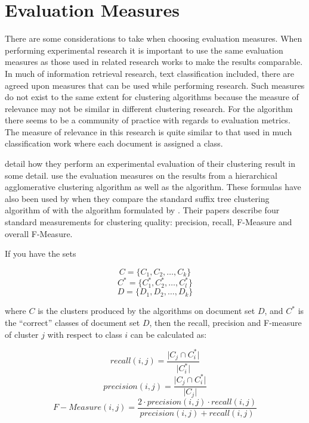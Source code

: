 \section{Evaluation Measures}
\label{EvaluationMeasures}
There are some considerations to take when choosing evaluation measures. When performing experimental research it is important to use the same evaluation measures as those used in related research works to make the results comparable. In much of information retrieval research, text classification included, there are agreed upon measures that can be used while performing research. Such measures do not exist to the same extent for clustering algorithms because the measure of relevance may not be similar in different clustering research. For the \STC algorithm there seems to be a community of practice with regards to evaluation metrics. The measure of relevance in this research is quite similar to that used in much classification work where each document is assigned a class.

\cite{Chim2007} detail how they perform an experimental evaluation of their clustering result in some detail. \citeauthor{Chim2007} use the evaluation measures on the results from a hierarchical agglomerative clustering algorithm as well as the \STC algorithm. These formulas have also been used by \cite{Rafi2011} when they compare the standard suffix tree clustering algorithm of \citeauthor{Oren1998} with the algorithm formulated by \citeauthor{Chim2008}. Their papers describe four standard measurements for clustering quality: precision, recall, F-Measure and overall F-Measure.

If you have the sets

\begin{displaymath}
C = \{C_{1}, C_{2}, \dots, C_{k}\}
\end{displaymath}
\begin{displaymath}
C^* = \{C_1^*, C_2^*, \dots, C_l^*\}
\end{displaymath}
\begin{displaymath}
D = \{D_{1}, D_{2}, \dots, D_{k}\}
\end{displaymath}

where \(C\) is the clusters produced by the algorithms on document set \(D\), and \(C^*\) is the ``correct'' classes of document set \(D\), then the recall, precision and F-measure of cluster \(j\) with respect to class \(i\) can be calculated as:

\begin{displaymath}
recall(i,j) = \frac{\vert C_{j} \cap C_i^* \vert}{\vert C_i^* \vert}
\end{displaymath}
\begin{displaymath}
precision(i,j) = \frac{\vert C_{j} \cap C_i^* \vert}{\vert C_{j} \vert}
\end{displaymath}
\begin{displaymath}
F-Measure(i,j) = \frac{2 \cdot precision(i,j) \cdot recall(i,j)}{precision(i,j) + recall(i,j)}
\end{displaymath}

